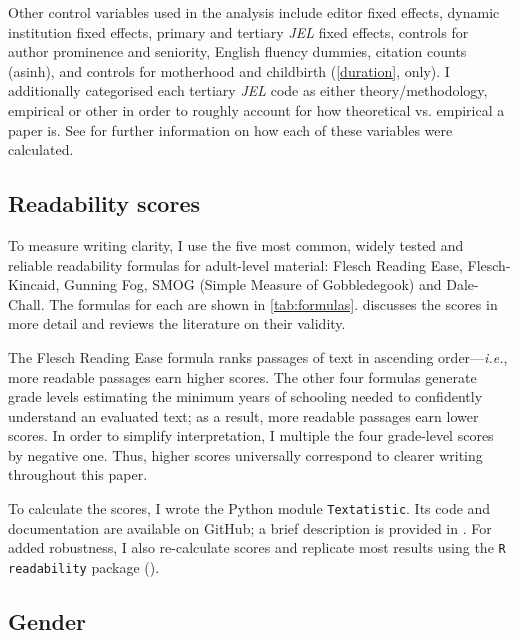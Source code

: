 Other control variables used in the analysis include editor fixed effects, dynamic institution fixed effects, primary and tertiary \emph{JEL} fixed effects, controls for author prominence and seniority, English fluency dummies, citation counts (asinh), and controls for motherhood and childbirth (\autoref{duration}, only). I additionally categorised each tertiary \emph{JEL} code as either theory\slash methodology, empirical or other in order to roughly account for how theoretical vs. empirical a paper is. See  for further information on how each of these variables were calculated.

\subsection{Readability scores}
\label{readability}

To measure writing clarity, I use the five most common, widely tested and reliable readability formulas for adult-level material: Flesch Reading Ease, Flesch-Kincaid, Gunning Fog, SMOG (Simple Measure of Gobbledegook) and Dale-Chall. The formulas for each are shown in \autoref{tab:formulas}.  discusses the scores in more detail and reviews the literature on their validity.



The Flesch Reading Ease formula ranks passages of text in ascending order---\emph{i.e.}, more readable passages earn higher scores. The other four formulas generate grade levels estimating the minimum years of schooling needed to confidently understand an evaluated text; as a result, more readable passages earn lower scores. In order to simplify interpretation, I multiple the four grade-level scores by negative one. Thus, higher scores universally correspond to clearer writing throughout this paper.

To calculate the scores, I wrote the Python module \texttt{Textatistic}. Its code and documentation are available on GitHub; a brief description is provided in . For added robustness, I also re-calculate scores and replicate most results using the \texttt{R readability} package ().

\subsection{Gender}
\label{gender}

